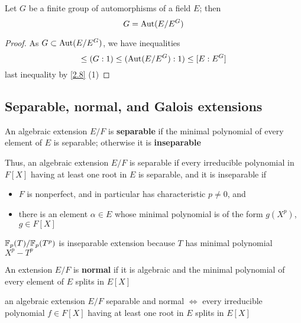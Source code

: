 \documentclass[11pt]{article}
\begin{document}
\begin{corollary}[]
\label{3.5}
Let \(G\) be a finite group of automorphisms of a field \(E\); then
\begin{equation*}
G=\operatorname{\text{Aut}}(E/E^G)
\end{equation*}
\end{corollary}

\begin{proof}
As \(G\subset\operatorname{\text{Aut}}(E/E^G)\), we have inequalities
\begin{equation*}
[E:E^G]\le(G:1)\le(\Aut(E/E^G):1)\le[E:E^G]
\end{equation*}
last inequality by \ref{2.8} (1)
\end{proof}
\subsection{Separable, normal, and Galois extensions}
\label{sec:org67c49ff}
\begin{definition}[]
An algebraic extension \(E/F\) is \textbf{separable} if the minimal polynomial of every element of \(E\)
is separable; otherwise it is \textbf{inseparable}
\end{definition}

Thus, an algebraic extension \(E/F\) is separable if every irreducible polynomial in \(F[X]\)
having at least one root in \(E\) is separable, and it is inseparable if
\begin{itemize}
\item \(F\) is nonperfect, and in particular has characteristic \(p\neq 0\), and
\item there is an element \(\alpha\in E\) whose minimal polynomial is of the form \(g(X^p)\), \(g\in F[X]\)
\end{itemize}


\(\mathbb{F}_p(T)/\mathbb{F}_p(T^p)\) is inseparable extension because \(T\) has minimal polynomial \(X^p-T^p\)


\begin{definition}[]
An extension \(E/F\) is \textbf{normal} if it is algebraic and the minimal polynomial of every element
of \(E\) splits in \(E[X]\)
\end{definition}

an algebraic extension \(E/F\) separable and normal \(\Leftrightarrow\) every irreducible polynomial \(f\in F[X]\) having at least
one root in \(E\) splits in \(E[X]\)
\end{document}
